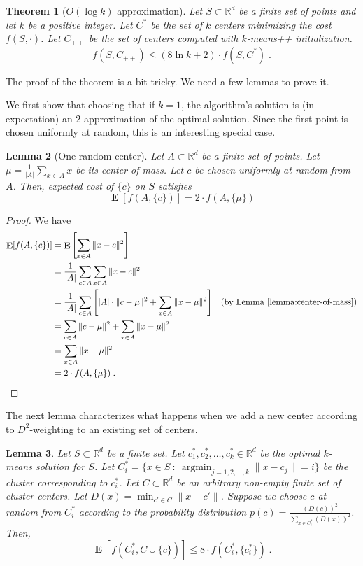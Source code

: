 \documentclass{article}
\newtheorem{lemma}{Lemma}
\newtheorem{theorem}[lemma]{Theorem}
\newcommand{\R}{\mathbb{R}}
\newcommand{\norm}[1]{\|{#1}\|}
\DeclareMathOperator*{\argmin}{argmin}
\DeclareMathOperator*{\Exp}{\mathbf{E}}
\begin{document}
\begin{theorem}[$O(\log k)$ approximation]
Let $S \subset \R^d$ be a finite set of points and let $k$ be a positive integer.
Let $C^*$ be the set of $k$ centers minimizing the cost $f(S,\cdot)$.
Let $C_{++}$ be the set of centers computed with $k$-means++ initialization.
$$
f(S, C_{++}) \le (8 \ln k + 2) \cdot f(S, C^*) \; .
$$
\end{theorem}

The proof of the theorem is a bit tricky. We need a few lemmas to prove it.

We first show that choosing that if $k=1$, the algorithm's solution is (in
expectation) an $2$-approximation of the optimal solution. Since the first point
is chosen uniformly at random, this is an interesting special case.

\begin{lemma}[One random center]
\label{lemma:one-random-center}
Let $A \subset \R^d$ be a finite set of points. Let $\mu = \frac{1}{|A|} \sum_{x \in A} x$
be its center of mass. Let $c$ be chosen uniformly at random from $A$. Then,
expected cost of $\{c\}$ on $S$ satisfies
$$
\Exp[f(A,\{c\})] = 2 \cdot f(A, \{\mu\})
$$
\end{lemma}

\begin{proof}
We have
\begin{align*}
\Exp[f(A,\{c\})]
& = \Exp\left[\sum_{x \in A} \norm{x - c}^2\right] \\
& = \frac{1}{|A|} \sum_{c \in A} \sum_{x \in A} \norm{x - c}^2 \\
& = \frac{1}{|A|} \sum_{c \in A} \left[ |A| \cdot \norm{c - \mu}^2 + \sum_{x \in A} \norm{x - \mu}^2 \right] & \text{(by Lemma~\ref{lemma:center-of-mass})} \\
& = \sum_{c \in A} \norm{c - \mu}^2 + \sum_{x \in A} \norm{x - \mu}^2 \\
& = \sum_{x \in A} \norm{x - \mu}^2 \\
& = 2 \cdot f(A, \{\mu\}) \; .
\end{align*}
\end{proof}

The next lemma characterizes what happens when we add a new center
according to $D^2$-weighting to an existing set of centers.

\begin{lemma}
Let $S \subset \R^d$ be a finite set. Let $c^*_1, c^*_2, \dots, c^*_k \in \R^d$
be the optimal $k$-means solution for $S$. Let $C^*_i = \{ x \in S ~:~
\argmin_{j=1,2,\dots,k} \norm{x - c_j} = i\}$ be the cluster corresponding to
$c^*_i$. Let $C \subset \R^d$ be an arbitrary non-empty finite set of cluster centers.
Let $D(x) = \min_{c' \in C} \norm{x - c'}$. Suppose we
choose $c$ at random from $C^*_i$ according to the probability distribution $p(c) =
\frac{(D(c))^2}{\sum_{x \in C_i^*} (D(x))^2}$. Then,
$$
\Exp[f(C_i^*, C \cup \{c\})] \le 8 \cdot f(C^*_i, \{c^*_i\}) \; .
$$
\end{lemma}
\end{document}
